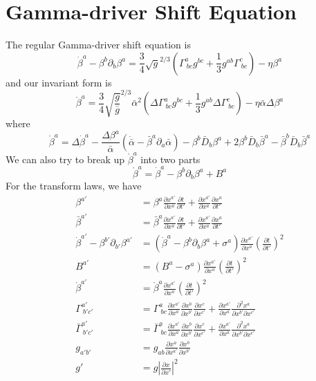 \documentclass{article}
\begin{document}
\section{Gamma-driver Shift Equation}
The regular Gamma-driver shift equation is
\begin{equation}\label{regular gamma-driver}
{\dot \beta}^{a} - \beta^{b}\partial_{b}\beta^{a} = \frac{3}{4}\sqrt{g}^{2/3}(\Gamma^{a}_{~bc}g^{bc} + \frac{1}{3}g^{ab}\Gamma^{c}_{~bc}) - \eta \beta^{a} 
\end{equation}
and our invariant form is
\begin{equation}\label{invariant gamma-driver}
\mathring{\beta}^{a} = \frac{3}{4}\sqrt{\frac{g}{{\bar g}}}^{2/3}{\bar \alpha}^{2}(\Delta \Gamma^{a}_{~bc}g^{bc} + \frac{1}{3}g^{ab}\Delta\Gamma^{c}_{~bc}) - \eta {\bar \alpha}\Delta\beta^{a} 
\end{equation}
where
\[
\mathring{\beta}^{a} =  \Delta {\dot \beta}^{a} -\frac{\Delta \beta^{a}}{{\bar \alpha}}({\dot {\bar \alpha}} - {\bar \beta}^{a}\partial_{a}{\bar \alpha}) - \beta^{b}{\bar D}_{b}\beta^{a} + 2\beta^{b}{\bar D}_{b}{\bar \beta}^{a} - {\bar \beta}^{b}{\bar D}_{b}{\bar \beta}^{a}
\]
We can also try to break up $\mathring{\beta}^{a}$ into two parts
\[
\mathring{\beta}^{a} = {\dot \beta}^{a} - \beta^{b}\partial_{b}\beta^{a} + B^{a}
\]
For the transform laws, we have
\begin{align*}
\beta^{a'} & = \beta^{a}\frac{\partial x^{a'}}{\partial x^{a}}\frac{\partial t}{\partial t'} + \frac{\partial x^{a'}}{\partial x^{a}}\frac{\partial x^{a}}{\partial t'}\\
{\bar \beta}^{a'} & = {\bar\beta}^{a}\frac{\partial x^{a'}}{\partial x^{a}}\frac{\partial t}{\partial t'} + \frac{\partial x^{a'}}{\partial x^{a}}\frac{\partial x^{a}}{\partial t'}\\
{\dot \beta}^{a'} - \beta^{b'}\partial_{b'}\beta^{a'} & = ({\dot \beta}^{a} - \beta^{b}\partial_{b}\beta^{a} + \sigma^{a})\frac{\partial x^{a'}}{\partial x^{a}}\left(\frac{\partial t}{\partial t'}\right)^{2}\\
B^{a'} & = (B^{a} - \sigma^{a})\frac{\partial x^{a'}}{\partial x^{a}}\left(\frac{\partial t}{\partial t'}\right)^{2}\\
\mathring{\beta}^{a'} & = \mathring{\beta}^{a}\frac{\partial x^{a'}}{\partial x^{a}}\left(\frac{\partial t}{\partial t'}\right)^{2}\\
\Gamma^{a'}_{~b'c'} & = \Gamma^{a}_{~bc}\frac{\partial x^{a'}}{\partial x^{a}}\frac{\partial x^{b}}{\partial x^{b'}}\frac{\partial x^{c}}{\partial x^{c'}} + \frac{\partial x^{a'}}{\partial x^{a}}\frac{\partial^{2}x^{a}}{\partial x^{b'}\partial x^{c'}}\\
{\bar\Gamma}^{a'}_{~b'c'} & = {\bar \Gamma}^{a}_{~bc}\frac{\partial x^{a'}}{\partial x^{a}}\frac{\partial x^{b}}{\partial x^{b'}}\frac{\partial x^{c}}{\partial x^{c'}} + \frac{\partial x^{a'}}{\partial x^{a}}\frac{\partial^{2}x^{a}}{\partial x^{b'}\partial x^{c'}}\\
g_{a'b'} & = g_{ab}\frac{\partial x^{a}}{\partial x^{a'}}\frac{\partial x^{b}}{\partial x^{b'}}\\
g' & = g\left|\frac{\partial x}{\partial x'}\right|^{2}
\end{align*}
\end{document}
